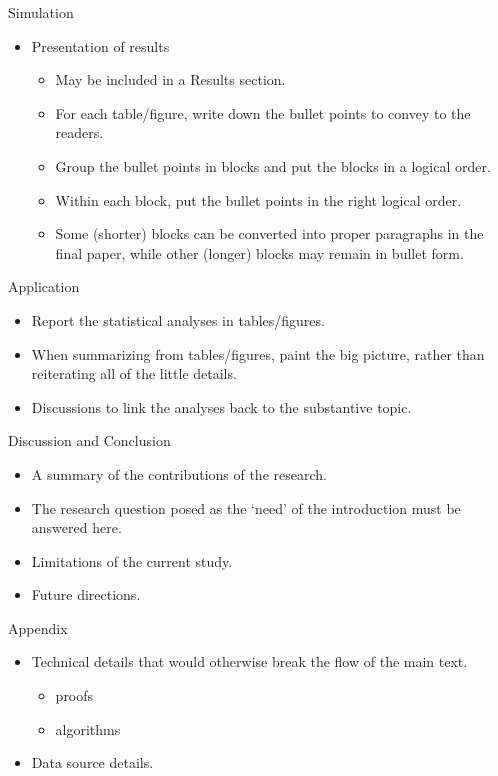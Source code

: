 \documentclass{beamer}
\begin{document}
    
    \begin{frame}{Simulation}
    \begin{itemize}
        \item Presentation of results
        \begin{itemize}
            \item May be included in a Results section.
            \item For each table/figure, write down the bullet points to convey to the readers.
            \item Group the bullet points in blocks and put the blocks in a logical order.
            \item Within each block, put the bullet points in the right logical order.
            \item Some (shorter) blocks can be converted into proper paragraphs in the final paper, while other (longer) blocks may remain in bullet form.
        \end{itemize}
    \end{itemize}
    \end{frame}
    
    
    \begin{frame}{Application}
    \begin{itemize}
        \item Report the statistical analyses in tables/figures.
        \item When summarizing from tables/figures, paint the big picture, rather than reiterating all of the little details.
        \item Discussions to link the analyses back to the substantive topic.
    \end{itemize}
    \end{frame}
    
    
    \begin{frame}{Discussion and Conclusion}
    \begin{itemize}
        \item A summary of the contributions of the research.
        \item The research question posed as the `need’ of the introduction must be answered here.
        \item Limitations of the current study.
        \item Future directions.
    \end{itemize}
    \end{frame}
    
    
    \begin{frame}{Appendix}
    \begin{itemize}
        \item Technical details that would otherwise break the flow of the main text.
        \begin{itemize}
            \item proofs
            \item algorithms
        \end{itemize}
        \item Data source details.
    \end{itemize}
    \end{frame}
    
\end{document}

